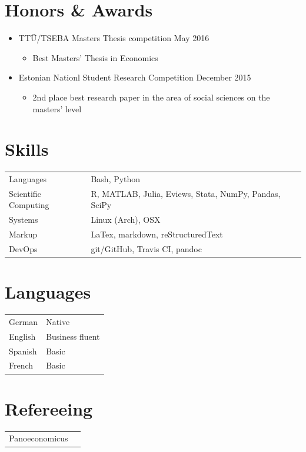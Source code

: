 \documentclass[11pt,letter,sans]{moderncv}
\begin{document}
\section{Honors \& Awards}
\begin{itemize}
    \item TTÜ/TSEBA Masters Thesis competition \hfill May 2016
      \begin{itemize}
      \item Best Masters' Thesis in Economics
      \end{itemize}
    \item Estonian Nationl Student Research Competition \hfill December 2015
      \begin{itemize}
      \item 2nd place best research paper in the area of social sciences on the masters' level
      \end{itemize}
\end{itemize}


\section{Skills}
\begin{tabular}{p{1.5in}p{5in}}
    Languages & Bash, Python \\
    Scientific Computing & R, MATLAB, Julia, Eviews, Stata, NumPy, Pandas, SciPy \\
    Systems & Linux (Arch), OSX \\
    Markup & LaTex, markdown, reStructuredText \\
    DevOps & git/GitHub, Travis CI, pandoc \\
\end{tabular}


\section{Languages}
\begin{tabular}{p{1.5in}p{5in}}
    German & Native \\
    English & Business fluent \\
    Spanish & Basic \\
    French & Basic \\
\end{tabular}


\section{Refereeing}
\begin{tabular}{p{1.5in}p{5in}}
    Panoeconomicus \\
\end{tabular}
\end{document}
